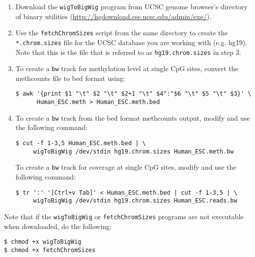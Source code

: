 \documentclass[10pt]{article}
\newcommand{\prog}[1]{\texttt{#1}}
\newcommand{\fn}[1]{\texttt{#1}}
\begin{document}
\begin{enumerate}
\item Download the \prog{wigToBigWig} program from UCSC genome
  browser's directory of binary utilities
  (\url{http://hgdownload.cse.ucsc.edu/admin/exe/}).
\item Use the \fn{fetchChromSizes} script from the same directory to
  create the \fn{*.chrom.sizes} file for the UCSC database you are
  working with (e.g. hg19). Note that this is the file that is
  referred to as \fn{hg19.chrom.sizes} in step 3.
\item To create a \fn{bw} track for methylation level at single CpG
  sites, convert the methcounts file to bed format using:
\begin{verbatim}
$ awk '{print $1 "\t" $2 "\t" $2+1 "\t" $4":"$6 "\t" $5 "\t" $3}' \
      Human_ESC.meth > Human_ESC.meth.bed
\end{verbatim}
\item To create a \fn{bw} track from the bed format methcounts output, modify and use the following command:
\begin{verbatim}
$ cut -f 1-3,5 Human_ESC.meth.bed | \
     wigToBigWig /dev/stdin hg19.chrom.sizes Human_ESC.meth.bw
\end{verbatim}
  To create a \fn{bw} track for coverage at single CpG sites, modify
  and use the following command:
\begin{verbatim}
$ tr ':' '[Ctrl+v Tab]' < Human_ESC.meth.bed | cut -f 1-3,5 | \
     wigToBigWig /dev/stdin hg19.chrom.sizes Human_ESC.reads.bw
\end{verbatim}
\end{enumerate}
Note that if the \prog{wigToBigWig} or \prog{fetchChromSizes} programs
are not executable when downloaded, do the following:
\begin{verbatim}
$ chmod +x wigToBigWig
$ chmod +x fetchChromSizes
\end{verbatim}
\end{document}
